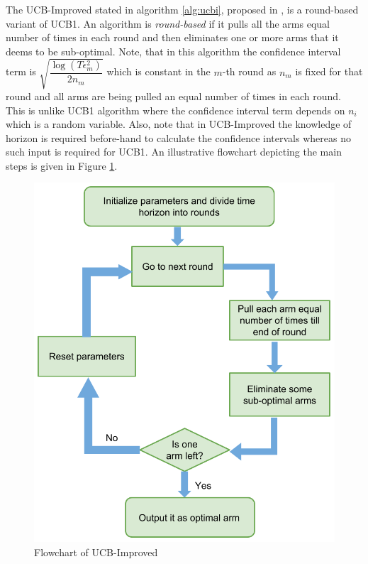     The UCB-Improved  stated in algorithm \ref{alg:ucbi}, proposed in \citet{auer2010ucb}, is a round-based variant of UCB1. An algorithm is \textit{round-based} if it pulls all the arms equal number of times in each round and then eliminates one or more arms that it deems to be sub-optimal. Note, that in this algorithm the confidence interval term is $\sqrt{\dfrac{\log{( T\epsilon_{m}^{2})}}{2 n_{m}}}$ which is constant in the $m$-th round as $n_m$ is fixed for that round and all arms are being pulled an equal number of times in each round. This is unlike UCB1 algorithm where the confidence interval term depends on $n_i$ which is a random variable. Also, note that in UCB-Improved the knowledge of horizon is required before-hand to calculate the confidence intervals whereas no such input is required for UCB1. An illustrative flowchart depicting the main steps is given in Figure \ref{fig:ucbimp}.
    
\begin{figure}[!th]
\includegraphics[scale=0.45]{Chapter2/img/Ucb-Imp.png}
\caption{Flowchart of UCB-Improved}
\label{fig:ucbimp}
\end{figure}
    
